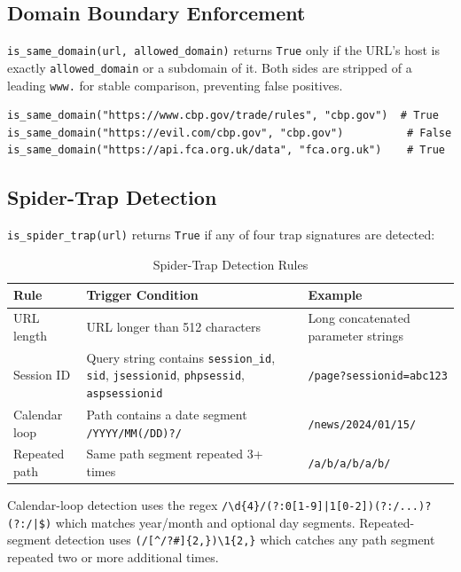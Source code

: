 \documentclass[12pt,a4paper]{article}
\begin{document}
\subsection{Domain Boundary Enforcement}

\texttt{is\_same\_domain(url, allowed\_domain)} returns \texttt{True} only if the URL's host is exactly \texttt{allowed\_domain} or a subdomain of it. Both sides are stripped of a leading \texttt{www.} for stable comparison, preventing false positives.

\begin{lstlisting}[caption={Domain boundary check examples}]
is_same_domain("https://www.cbp.gov/trade/rules", "cbp.gov")  # True
is_same_domain("https://evil.com/cbp.gov", "cbp.gov")          # False
is_same_domain("https://api.fca.org.uk/data", "fca.org.uk")    # True
\end{lstlisting}

\subsection{Spider-Trap Detection}

\texttt{is\_spider\_trap(url)} returns \texttt{True} if any of four trap signatures are detected:

\begin{table}[H]
\centering
\caption{Spider-Trap Detection Rules}\label{tab:trapdetect}
\begin{tabularx}{\textwidth}{@{}l X X@{}}
\toprule
\textbf{Rule} & \textbf{Trigger Condition} & \textbf{Example} \\
\midrule
URL length     & URL longer than 512 characters & Long concatenated parameter strings \\
Session ID     & Query string contains \texttt{session\_id}, \texttt{sid}, \texttt{jsessionid}, \texttt{phpsessid}, \texttt{aspsessionid} & \texttt{/page?sessionid=abc123} \\
Calendar loop  & Path contains a date segment \texttt{/YYYY/MM(/DD)?/} & \texttt{/news/2024/01/15/} \\
Repeated path  & Same path segment repeated 3+ times & \texttt{/a/b/a/b/a/b/} \\
\bottomrule
\end{tabularx}
\end{table}

Calendar-loop detection uses the regex \texttt{/\textbackslash d\{4\}/(?:0[1-9]|1[0-2])(?:/...)?(?:/|\$)} which matches year/month and optional day segments. Repeated-segment detection uses \texttt{(/[\string^/?{\#}]\{2,\})\textbackslash 1\{2,\}} which catches any path segment repeated two or more additional times.
\end{document}
